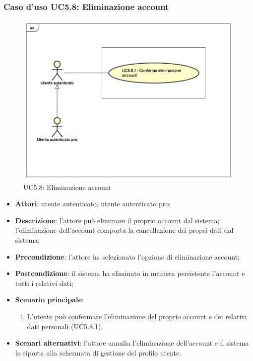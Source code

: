 \subsubsection{Caso d'uso UC5.8: Eliminazione account}
\label{UC5.8}
\begin{figure}[h]
	\centering
	\includegraphics[scale=0.5,keepaspectratio]{UML/UC5_8.png}
	\caption{UC5.8: Eliminazione account}
\end{figure}

\begin{itemize}
	\item \textbf{Attori}: utente autenticato, utente autenticato pro;
	\item \textbf{Descrizione}: l'attore può eliminare il proprio account dal sistema; l'eliminazione dell'account comporta la cancellazione dei propri dati dal sistema; 
	\item \textbf{Precondizione}: l'attore ha selezionato l'opzione di eliminazione account;
	\item \textbf{Postcondizione}: il sistema ha eliminato in maniera persistente l'account e tutti i relativi dati;
	\item \textbf{Scenario principale}:
		\begin{enumerate}
			\item L'utente può confermare l'eliminazione del proprio account e dei relativi dati personali (UC5.8.1).
		\end{enumerate}
		\item \textbf{Scenari alternativi}: l'attore annulla l'eliminazione dell'account e il sistema lo riporta alla schermata di gestione del profilo utente.
\end{itemize}

